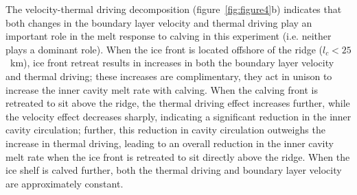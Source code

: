 \documentclass[draft]{agujournal2019}
\begin{document}
The velocity-thermal driving decomposition (figure~\ref{fig:figure4}b) indicates that both changes in the boundary layer velocity and thermal driving play an important role in the melt response to calving in this experiment (i.e. neither plays a dominant role).  When the ice front is located offshore of the ridge ($l_c < 25$~km), ice front retreat results in increases in both the boundary layer velocity and thermal driving; these increases are complimentary, they act in unison to increase the inner cavity melt rate with calving. When the calving front is retreated to sit above the ridge, the thermal driving effect increases further, while the velocity effect decreases sharply, indicating a significant reduction in the inner cavity circulation; further, this reduction in cavity circulation outweighs the increase in thermal driving, leading to an overall reduction in the inner cavity melt rate when the ice front is retreated to sit directly above the ridge. When the ice shelf is calved further, both the thermal driving and boundary layer velocity are approximately constant.
\end{document}
